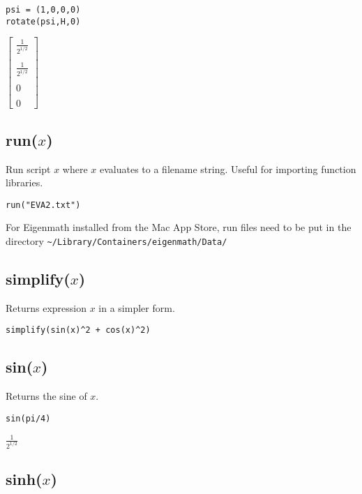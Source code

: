 \documentclass[12pt]{article}
\begin{document}
{\color{blue}
\begin{verbatim}
psi = (1,0,0,0)
rotate(psi,H,0)
\end{verbatim}
}

\noindent
$\displaystyle
\begin{bmatrix}
{\displaystyle \frac{1}{2^{1/2}}}
\\
\\
{\displaystyle \frac{1}{2^{1/2}}}
\\
\\
0
\\
\\
0
\end{bmatrix}
$

\subsection*{run($x$)}

Run script $x$ where $x$ evaluates to a filename string.
Useful for importing function libraries.

{\color{blue}
\begin{verbatim}
run("EVA2.txt")
\end{verbatim}
}

\noindent
For Eigenmath installed from the Mac App Store,
run files need to be put in the directory
\verb$~/Library/Containers/eigenmath/Data/$

\subsection*{simplify($x$)}

Returns expression $x$ in a simpler form.

{\color{blue}
\begin{verbatim}
simplify(sin(x)^2 + cos(x)^2)
\end{verbatim}
}


\subsection*{sin($x$)}

Returns the sine of $x$.

{\color{blue}
\begin{verbatim}
sin(pi/4)
\end{verbatim}
}

\noindent
$\displaystyle \frac{1}{2^{1/2}}$

\subsection*{sinh($x$)}
\end{document}
